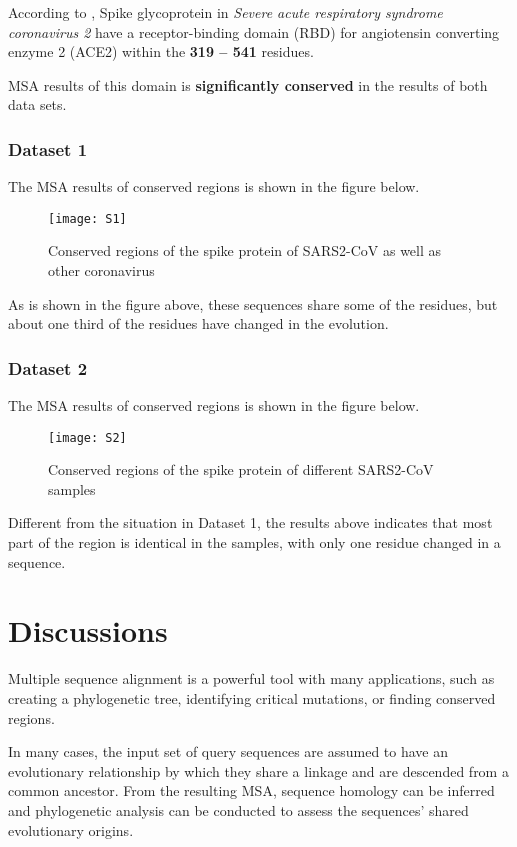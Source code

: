 \documentclass[en,black,12pt,normal]{elegantnote}
\newcommand{\upcite}[1]{\textsuperscript{\textsuperscript{\cite{#1}}}}
\begin{document}
According to \citet{yan2020structural}, Spike glycoprotein in \textit{Severe acute respiratory syndrome coronavirus 2} have a receptor-binding domain (RBD) for angiotensin converting enzyme 2 (ACE2) within the \textbf{319 – 541} residues.\cite{yan2020structural}

MSA results of this domain is \textbf{significantly conserved} in the results of both data sets.



\subsubsection{Dataset 1}

The MSA results of conserved regions is shown in the figure below.
\begin{figure}[H]
    \centering
    \texttt{[image: S1]}
    \caption{Conserved regions of the spike protein of SARS2-CoV as well as other coronavirus}
    \label{S-01}
\end{figure}

As is shown in the figure above, these sequences share some of the residues, but about one third of the residues have changed in the evolution.

\subsubsection{Dataset 2}

The MSA results of conserved regions is shown in the figure below.
\begin{figure}[H]
    \centering
    \texttt{[image: S2]}
    \caption{Conserved regions of the spike protein of different SARS2-CoV samples}
    \label{S-02}
\end{figure}

Different from the situation in Dataset 1, the results above indicates that most part of the region is identical in the samples, with only one residue changed in a sequence.


\section{Discussions}

Multiple sequence alignment is a powerful tool with many applications, such as creating a phylogenetic tree, identifying critical mutations, or finding conserved regions.

In many cases, the input set of query sequences are assumed to have an evolutionary relationship by which they share a linkage and are descended from a common ancestor. From the resulting MSA, sequence homology can be inferred and phylogenetic analysis can be conducted to assess the sequences' shared evolutionary origins.\upcite{wiki:Multiple_sequence_alignment}
\end{document}
